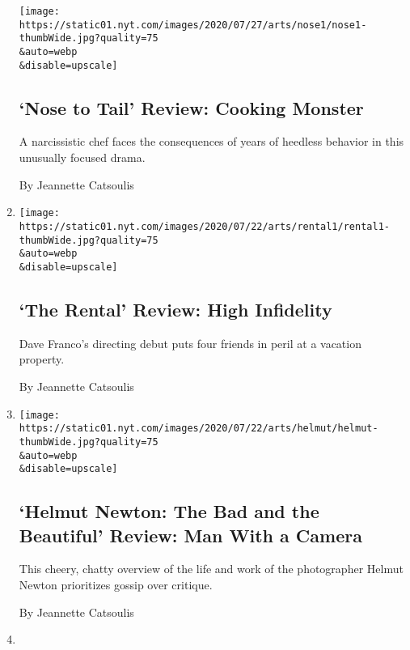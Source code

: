 \begin{enumerate}
  \texttt{[image: https://static01.nyt.com/images/2020/07/27/arts/nose1/nose1-thumbWide.jpg?quality=75\\\&auto=webp\\\&disable=upscale]}

  \hypertarget{nose-to-tail-review-cooking-monster}{%
  \subsection{`Nose to Tail' Review: Cooking
  Monster}\label{nose-to-tail-review-cooking-monster}}

  A narcissistic chef faces the consequences of years of heedless
  behavior in this unusually focused drama.

  By Jeannette Catsoulis
\item
  \href{/2020/07/23/movies/the-rental-review-high-infidelity.html}{}

  \texttt{[image: https://static01.nyt.com/images/2020/07/22/arts/rental1/rental1-thumbWide.jpg?quality=75\\\&auto=webp\\\&disable=upscale]}

  \hypertarget{the-rental-review-high-infidelity}{%
  \subsection{`The Rental' Review: High
  Infidelity}\label{the-rental-review-high-infidelity}}

  Dave Franco's directing debut puts four friends in peril at a vacation
  property.

  By Jeannette Catsoulis
\item
  \href{/2020/07/23/movies/helmut-newton-the-bad-and-the-beautiful-review.html}{}

  \texttt{[image: https://static01.nyt.com/images/2020/07/22/arts/helmut/helmut-thumbWide.jpg?quality=75\\\&auto=webp\\\&disable=upscale]}

  \hypertarget{helmut-newton-the-bad-and-the-beautiful-review-man-with-a-camera}{%
  \subsection{`Helmut Newton: The Bad and the Beautiful' Review: Man
  With a
  Camera}\label{helmut-newton-the-bad-and-the-beautiful-review-man-with-a-camera}}

  This cheery, chatty overview of the life and work of the photographer
  Helmut Newton prioritizes gossip over critique.

  By Jeannette Catsoulis
\item
  \href{/2020/07/23/movies/yes-god-yes-review.html}{}


\end{enumerate}
